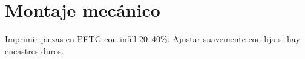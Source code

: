 \chapter{Montaje mecánico}
\label{ch:mechanical}
\begin{tipbox}
Imprimir piezas en PETG con infill 20–40\%. Ajustar suavemente con lija si hay encastres duros.  
\end{tipbox}

